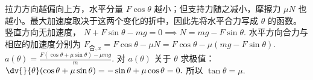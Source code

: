 拉力方向越偏向上方，水平分量 \(F\cos\theta\) 越小；但支持力随之减小，摩擦力 \(\mu N\) 也越小。最大加速度取决于这两个变化的折中，因此先将水平合力写成 \(\theta\) 的函数。竖直方向无加速度，
 \(N+F\sin\theta-mg=0 \implies N=mg-F\sin\theta.\) 
水平方向合力与相应的加速度分别为
 \(F_{\text{合},x}=F\cos\theta-\mu N =F\cos\theta-\mu(mg-F\sin\theta).\) 
 \(a(\theta)=\frac{F(\cos\theta+\mu\sin\theta)-\mu mg}{m}.\) 
对 \(a(\theta)\) 关于 \(\theta\) 求极值：
 \(\dv{}{\theta}(\cos\theta+\mu\sin\theta) =-\sin\theta+\mu\cos\theta=0.\) 
所以
 \(\tan\theta=\mu.\) 
